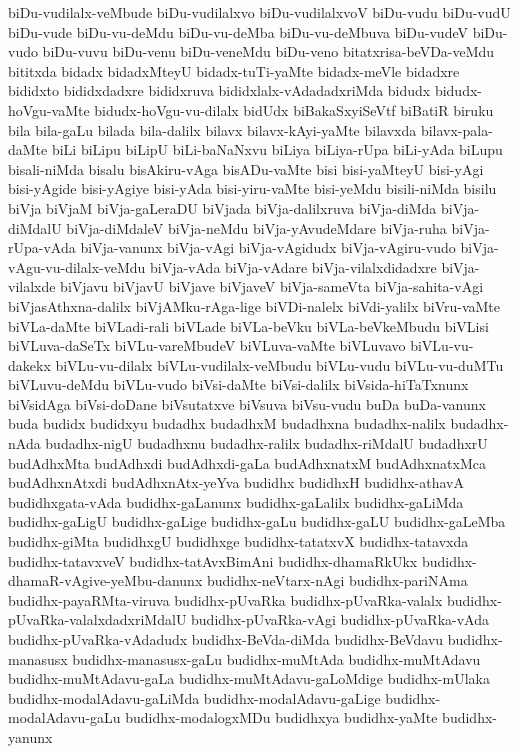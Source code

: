 {biDu-vudilalx-veMbude
biDu-vudilalxvo
biDu-vudilalxvoV
biDu-vudu
biDu-vudU
biDu-vude
biDu-vu-deMdu
biDu-vu-deMba
biDu-vu-deMbuva
biDu-vudeV
biDu-vudo
biDu-vuvu
biDu-venu
biDu-veneMdu
biDu-veno
bitatxrisa-beVDa-veMdu
bititxda
bidadx
bidadxMteyU
bidadx-tuTi-yaMte
bidadx-meVle
bidadxre
bididxto
bididxdadxre
bididxruva
bididxlalx-vAdadadxriMda
bidudx
bidudx-hoVgu-vaMte
bidudx-hoVgu-vu-dilalx
bidUdx
biBakaSxyiSeVtf
biBatiR
biruku
bila
bila-gaLu
bilada
bila-dalilx
bilavx
bilavx-kAyi-yaMte
bilavxda
bilavx-pala-daMte
biLi
biLipu
biLipU
biLi-baNaNxvu
biLiya
biLiya-rUpa
biLi-yAda
biLupu
bisali-niMda
bisalu
bisAkiru-vAga
bisADu-vaMte
bisi
bisi-yaMteyU
bisi-yAgi
bisi-yAgide
bisi-yAgiye
bisi-yAda
bisi-yiru-vaMte
bisi-yeMdu
bisili-niMda
bisilu
biVja
biVjaM
biVja-gaLeraDU
biVjada
biVja-dalilxruva
biVja-diMda
biVja-diMdalU
biVja-diMdaleV
biVja-neMdu
biVja-yAvudeMdare
biVja-ruha
biVja-rUpa-vAda
biVja-vanunx
biVja-vAgi
biVja-vAgidudx
biVja-vAgiru-vudo
biVja-vAgu-vu-dilalx-veMdu
biVja-vAda
biVja-vAdare
biVja-vilalxdidadxre
biVja-vilalxde
biVjavu
biVjavU
biVjave
biVjaveV
biVja-sameVta
biVja-sahita-vAgi
biVjasAthxna-dalilx
biVjAMku-rAga-lige
biVDi-nalelx
biVdi-yalilx
biVru-vaMte
biVLa-daMte
biVLadi-rali
biVLade
biVLa-beVku
biVLa-beVkeMbudu
biVLisi
biVLuva-daSeTx
biVLu-vareMbudeV
biVLuva-vaMte
biVLuvavo
biVLu-vu-dakekx
biVLu-vu-dilalx
biVLu-vudilalx-veMbudu
biVLu-vudu
biVLu-vu-duMTu
biVLuvu-deMdu
biVLu-vudo
biVsi-daMte
biVsi-dalilx
biVsida-hiTaTxnunx
biVsidAga
biVsi-doDane
biVsutatxve
biVsuva
biVsu-vudu
buDa
buDa-vanunx
buda
budidx
budidxyu
budadhx
budadhxM
budadhxna
budadhx-nalilx
budadhx-nAda
budadhx-nigU
budadhxnu
budadhx-ralilx
budadhx-riMdalU
budadhxrU
budAdhxMta
budAdhxdi
budAdhxdi-gaLa
budAdhxnatxM
budAdhxnatxMca
budAdhxnAtxdi
budAdhxnAtx-yeYva
budidhx
budidhxH
budidhx-athavA
budidhxgata-vAda
budidhx-gaLanunx
budidhx-gaLalilx
budidhx-gaLiMda
budidhx-gaLigU
budidhx-gaLige
budidhx-gaLu
budidhx-gaLU
budidhx-gaLeMba
budidhx-giMta
budidhxgU
budidhxge
budidhx-tatatxvX
budidhx-tatavxda
budidhx-tatavxveV
budidhx-tatAvxBimAni
budidhx-dhamaRkUkx
budidhx-dhamaR-vAgive-yeMbu-danunx
budidhx-neVtarx-nAgi
budidhx-pariNAma
budidhx-payaRMta-viruva
budidhx-pUvaRka
budidhx-pUvaRka-valalx
budidhx-pUvaRka-valalxdadxriMdalU
budidhx-pUvaRka-vAgi
budidhx-pUvaRka-vAda
budidhx-pUvaRka-vAdadudx
budidhx-BeVda-diMda
budidhx-BeVdavu
budidhx-manasusx
budidhx-manasusx-gaLu
budidhx-muMtAda
budidhx-muMtAdavu
budidhx-muMtAdavu-gaLa
budidhx-muMtAdavu-gaLoMdige
budidhx-mUlaka
budidhx-modalAdavu-gaLiMda
budidhx-modalAdavu-gaLige
budidhx-modalAdavu-gaLu
budidhx-modalogxMDu
budidhxya
budidhx-yaMte
budidhx-yanunx
}
